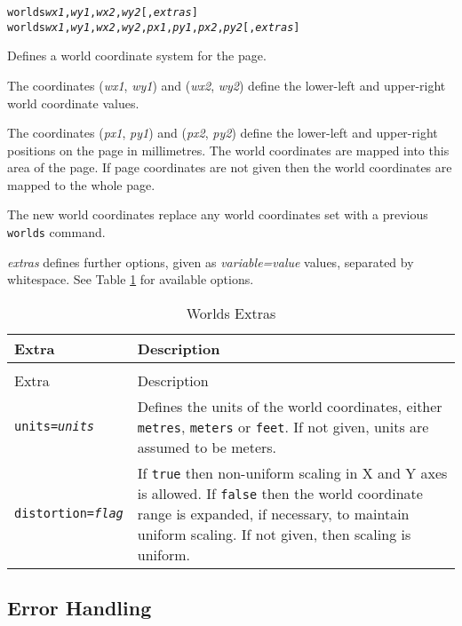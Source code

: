 \begin{alltt}
worlds \textit{wx1}, \textit{wy1}, \textit{wx2}, \textit{wy2} [, \textit{extras} ]
worlds \textit{wx1}, \textit{wy1}, \textit{wx2}, \textit{wy2}, \textit{px1}, \textit{py1}, \textit{px2}, \textit{py2} [, \textit{extras} ]
\end{alltt}

Defines a world coordinate system for the page.

The coordinates
(\textit{wx1}, \textit{wy1}) 
and
(\textit{wx2}, \textit{wy2})
define the lower-left and upper-right world coordinate values.

The coordinates
(\textit{px1}, \textit{py1}) 
and
(\textit{px2}, \textit{py2})
define the lower-left and upper-right positions on the page
in millimetres.  The world coordinates are mapped into this area
of the page.  If page coordinates are not given then the world
coordinates are mapped to the whole page.

The new world coordinates replace any world coordinates
set with a previous \texttt{worlds} command.

\textit{extras} defines further options, given as
\textit{variable=value} values, separated by whitespace.
See Table \ref{worldsextras}
for available options.

\begin{longtable}{|l|p{7cm}|}
\hline
\label{worldsextras}
Extra & Description \\
\hline
\hline
\endfirsthead
\hline
\caption{Worlds Extras} \\
\endfoot

\hline
Extra & Description \\
\hline
\hline
\endhead

\texttt{units=\textit{units}} &

Defines the units of the world coordinates,
either \texttt{metres}, \texttt{meters} or \texttt{feet}.
If not given, units are assumed to be meters. \\

\texttt{distortion=\textit{flag}} &

If \texttt{true} then non-uniform scaling in X and Y axes
is allowed.  If \texttt{false} then
the world coordinate range is expanded,
if necessary, to maintain uniform scaling.
If not given, then scaling is uniform. \\

\hline
\end{longtable}

\subsection{Error Handling}

